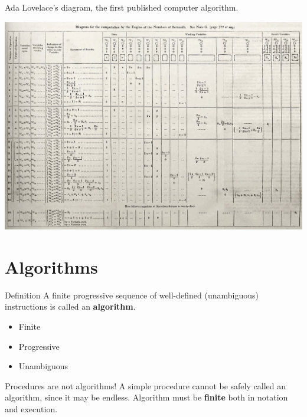 \documentclass{beamer}
\newcommand{\bfemph}[1]{\textbf{#1}}
\renewcommand{\emph}[1]{\bfemph{#1}}
\begin{document}
\begin{frame}
    Ada Lovelace's diagram, the first published computer algorithm.
    
    \bigskip
    
    \centerline{\includegraphics[scale=0.2]{figures/ada_diagram.jpg}}
    
\end{frame}

\section{Algorithms}
\begin{frame}

    \begin{block}{Definition}
        A finite progressive sequence of well-defined (unambiguous) instructions is called an \emph{algorithm}.
    \end{block}

    \bigskip

    \begin{itemize}
        \item Finite
        \item Progressive
        \item Unambiguous
    \end{itemize}

\end{frame}

\begin{frame}

    \begin{alertblock}{Procedures are not algorithms!}
        A simple procedure cannot be safely called an algorithm, since it may be endless. Algorithm must be \emph{finite} both in notation and execution.
    \end{alertblock}    

\end{frame}
\end{document}
